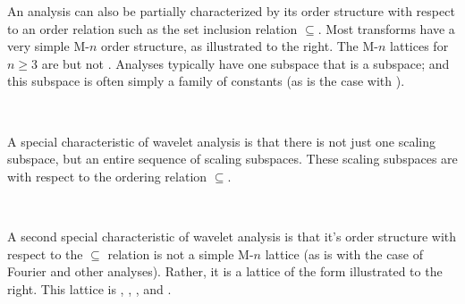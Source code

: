     \begin{minipage}{\tw-65mm}%
      An analysis can also be partially characterized by its order structure with respect
      to an order relation such as the set inclusion relation $\subseteq$.
      Most transforms have a very simple M-$n$ order structure,
      as illustrated to the right.
      The M-$n$ lattices for $n\ge3$ are  but not .
      Analyses typically have one subspace that is a  subspace;
      and this subspace is often simply a family of constants
      (as is the case with ).
    \end{minipage}%
    \hfill%
    \begin{minipage}{60mm}%
      \mbox{}\\%
    \end{minipage}%

    \begin{minipage}{\tw-55mm}%
      A special characteristic of wavelet analysis is that there is not just one
      scaling subspace,
      but an entire sequence of scaling subspaces.
      These scaling subspaces are  with respect to the
      ordering relation $\subseteq$.
    \end{minipage}%
    \hfill%
    \begin{minipage}{50mm}%
      \mbox{}\\%
      \fns%
    \end{minipage}%

    \begin{minipage}{\tw-65mm}%
      A second special characteristic of wavelet analysis is that it's order structure
      with respect to the $\subseteq$ relation is not a simple M-$n$ lattice 
     (as is with the case of Fourier and other analyses).
      Rather, it is a lattice of the form illustrated to the right.
      This lattice is , ,
      , and .
    \end{minipage}%
    \hfill%
    \begin{minipage}{60mm}%
      \mbox{}\\%
    \end{minipage}%

